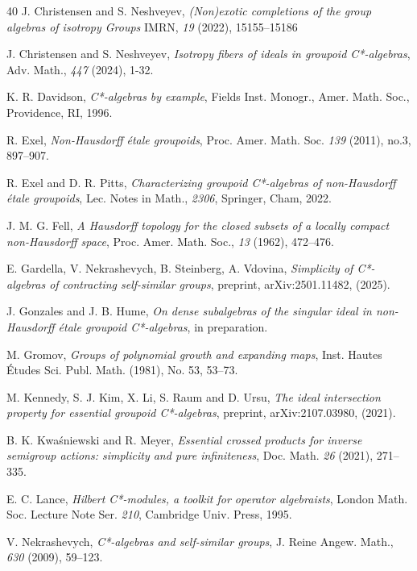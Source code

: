 \documentclass[a4paper, 12pt]{amsart}
\theoremstyle{definition}
\theoremstyle{remark}
\numberwithin{equation}{section}
\begin{document}
\begin{thebibliography}{40}
     J. Christensen and S. Neshveyev, \emph{(Non)exotic completions of the group algebras of isotropy Groups} IMRN, \emph{19} (2022), 15155–15186
     
     J. Christensen and S. Neshveyev, \emph{Isotropy fibers of ideals in groupoid C*-algebras}, Adv. Math., \emph{447} (2024), 1-32.
    
     K. R. Davidson, \emph{C*-algebras by example}, Fields Inst. Monogr.,  Amer. Math. Soc., Providence, RI, 1996.

     R. Exel, \emph{Non-Hausdorff \'etale groupoids}, Proc. Amer. Math. Soc. \emph{139} (2011), no.3, 897–907.

     R. Exel and D. R. Pitts, \emph{Characterizing groupoid C*-algebras of non-Hausdorff \'etale groupoids}, Lec. Notes in Math., \emph{2306}, Springer, Cham, 2022.
    
     J. M. G. Fell, \emph{A Hausdorff topology for the closed subsets of a locally compact non-Hausdorff space}, Proc. Amer. Math. Soc., \emph{13} (1962), 472–476.

     E. Gardella, V. Nekrashevych, B. Steinberg, A. Vdovina, \emph{Simplicity of    C*-algebras of contracting self-similar groups}, preprint, arXiv:2501.11482, (2025).
    
     J. Gonzales and J. B. Hume, \emph{On dense subalgebras of the singular ideal in non-Hausdorff \'etale groupoid C*-algebras}, in preparation.

     M. Gromov, \emph{Groups of polynomial growth and expanding maps}, Inst. Hautes \'Etudes Sci. Publ. Math. (1981), No. 53, 53–73.

     M. Kennedy, S. J. Kim, X. Li, S. Raum and D. Ursu, \emph{The ideal intersection property for essential groupoid C*-algebras}, preprint, arXiv:2107.03980, (2021).
    
     B. K. Kwa\'sniewski and R. Meyer, \emph{Essential crossed products for inverse semigroup actions: simplicity and pure infiniteness}, Doc. Math. \emph{26} (2021), 271–335.
    
     E. C. Lance, \emph{Hilbert C*-modules, a toolkit for operator algebraists}, London Math. Soc. Lecture Note Ser. \emph{210}, Cambridge Univ. Press, 1995.

     V. Nekrashevych, \emph{C*-algebras and self-similar groups}, J. Reine
Angew. Math., \emph{630} (2009), 59–123.
    

\end{thebibliography}
\end{document}
